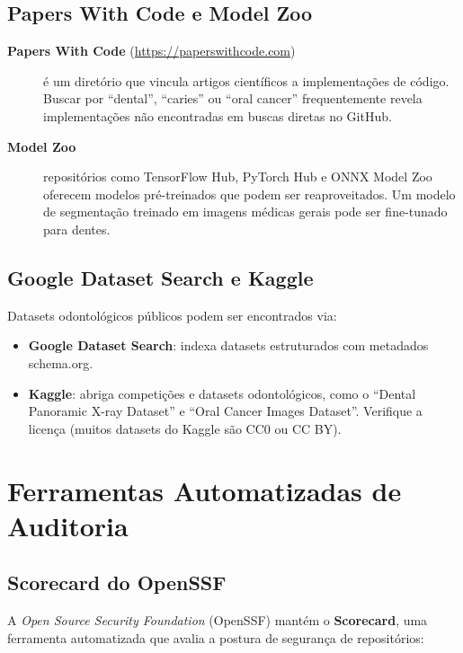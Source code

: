 \subsection{Papers With Code e Model Zoo}

\begin{description}
  \item[\textbf{Papers With Code} (\url{https://paperswithcode.com})] é um
    diretório que vincula artigos científicos a implementações de código.
    Buscar por ``dental'', ``caries'' ou ``oral cancer'' frequentemente
    revela implementações não encontradas em buscas diretas no GitHub.

  \item[\textbf{Model Zoo}] repositórios como TensorFlow Hub, PyTorch Hub e
    ONNX Model Zoo oferecem modelos pré-treinados que podem ser
    reaproveitados. Um modelo de segmentação treinado em imagens médicas
    gerais pode ser fine-tunado para dentes.
\end{description}

\subsection{Google Dataset Search e Kaggle}

Datasets odontológicos públicos podem ser encontrados via:

\begin{itemize}
  \item \textbf{Google Dataset Search}: indexa datasets estruturados com
    metadados schema.org.
  \item \textbf{Kaggle}: abriga competições e datasets odontológicos, como
    o ``Dental Panoramic X-ray Dataset'' e ``Oral Cancer Images Dataset''.
    Verifique a licença (muitos datasets do Kaggle são CC0 ou CC BY).
\end{itemize}

\section{Ferramentas Automatizadas de Auditoria}

\subsection{Scorecard do OpenSSF}

A \textit{Open Source Security Foundation} (OpenSSF) mantém o
\textbf{Scorecard}, uma ferramenta automatizada que avalia a postura de
segurança de repositórios:

